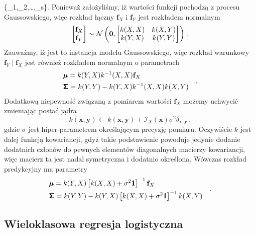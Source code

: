 \documentclass{myclass}
\begin{document}
\{_1,_2,\ldots,_s\}\). Ponieważ założyliśmy, iż wartości funkcji
pochodzą z procesu Gaussowskiego, więc rozkład łączny \(\mathbf{f}_X\) i \(\mathbf{f}_Y\) jest
rozkładem normalnym
\begin{equation*}
    \mqty[\mathbf{f}_X \\ \mathbf{f}_Y] \sim \mathcal{N}\left(\mathbf{0}, \mqty[k(X,X) & k(X,Y) \\ k(Y,X) & k(Y,Y)]\right)\,.
\end{equation*}
Zauważmy, iż jest to instancja modelu Gaussowskiego, więc rozkład warunkowy \(\mathbf{f}_Y\mid
\mathbf{f}_X\) jest również rozkładem normalnym o parametrach
\begin{equation*}
    \begin{split}
        &\boldsymbol{\mu} = k(Y,X)k^{-1}(X,X)\mathbf{f}_X\\
        &\boldsymbol{\mathsf{\Sigma}} = k(Y,Y) - k(Y,X)k^{-1}(X,X)k(X,Y)
    \end{split}\quad.
\end{equation*}
Dodatkową niepewność związaną z pomiarem wartości \(\mathbf{f}_X\) możemy uchwycić zmieniając postać
jądra 
\begin{equation*}
    k(\mathbf{x},\mathbf{y}) \leftarrow k(\mathbf{x},\mathbf{y}) + \mathcal{I}_X(\mathbf{x})\sigma^2\delta_{\mathbf{x},\mathbf{y}}\,,
\end{equation*}
gdzie \(\sigma\) jest hiper-parametrem określającym precyzję pomiaru. Oczywiście \(k\) jest dalej
funkcją kowariancji, gdyż takie podstawienie powoduje jedynie dodanie dodatnich członów do pewnych
elementów diagonalnych macierzy kowariancji, więc macierz ta jest nadal symetryczna i dodatnio
określona. Wówczas rozkład predykcyjny ma parametry
\begin{equation*}
    \begin{split}
        &\boldsymbol{\mu} = k(Y,X)\left[k(X,X) + \sigma^2\boldsymbol{\mathsf{1}}\right]^{-1}\mathbf{f}_X\\
        &\boldsymbol{\mathsf{\Sigma}} = k(Y,Y) - k(Y,X)\left[k(X,X) + \sigma^2\boldsymbol{\mathsf{1}}\right]^{-1}k(X,Y)
    \end{split}\quad.
\end{equation*}

\subsection{Wieloklasowa regresja logistyczna}
\end{document}
